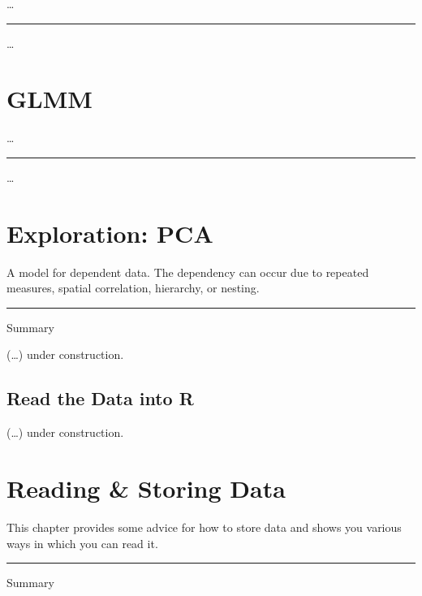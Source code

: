 \documentclass[
]{book}
\begin{document}
\ldots{}

\begin{center}\rule{0.5\linewidth}{0.5pt}\end{center}

\ldots{}

\hypertarget{glmm}{%
\chapter{GLMM}\label{glmm}}

\ldots{}

\begin{center}\rule{0.5\linewidth}{0.5pt}\end{center}

\ldots{}

\hypertarget{exploration-pca}{%
\chapter{Exploration: PCA}\label{exploration-pca}}

A model for dependent data. The dependency can occur due to repeated measures, spatial correlation, hierarchy, or nesting.

\begin{center}\rule{0.5\linewidth}{0.5pt}\end{center}

Summary

(\ldots) under construction.

\hypertarget{read-the-data-into-r-1}{%
\section{Read the Data into R}\label{read-the-data-into-r-1}}

(\ldots) under construction.

\hypertarget{reading-storing-data}{%
\chapter{Reading \& Storing Data}\label{reading-storing-data}}

This chapter provides some advice for how to store data and shows you various ways in which you can read it.

\begin{center}\rule{0.5\linewidth}{0.5pt}\end{center}

Summary
\end{document}
